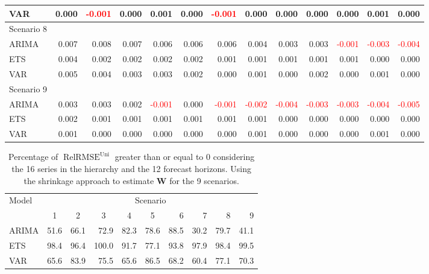 \documentclass[a4paper,preprint,11pt,authoryear]{elsarticle}
\DeclareMathOperator{\RelRMSE}{RelRMSE}
\DeclareMathOperator{\Uni}{Uni}
\begin{document}
\begin{table}
{\begin{tabular}{lrrrrrrrrrrrr}
      VAR & 0.000 & \textcolor{red}{-0.001} & 0.000 & 0.001 & 0.000 & \textcolor{red}{-0.001} & 0.000 & 0.000 & 0.000 & 0.000 & 0.001 & 0.000 \\
      \hline
      Scenario 8 & & & & & & & & & & & & \\
      \hline
      ARIMA & 0.007 & 0.008 & 0.007 & 0.006 & 0.006 & 0.006 & 0.004 & 0.003 & 0.003 & \textcolor{red}{-0.001} & \textcolor{red}{-0.003} & \textcolor{red}{-0.004} \\
      ETS & 0.004 & 0.002 & 0.002 & 0.002 & 0.002 & 0.001 & 0.001 & 0.001 & 0.001 & 0.001 & 0.000 & 0.000 \\
      VAR & 0.005 & 0.004 & 0.003 & 0.003 & 0.002 & 0.000 & 0.001 & 0.000 & 0.002 & 0.000 & 0.001 & 0.000 \\
      \hline
      Scenario 9 & & & & & & & & & & & & \\
      \hline
      ARIMA & 0.003 & 0.003 & 0.002 & \textcolor{red}{-0.001} & 0.000 & \textcolor{red}{-0.001} & \textcolor{red}{-0.002} & \textcolor{red}{-0.004} & \textcolor{red}{-0.003} & \textcolor{red}{-0.003} & \textcolor{red}{-0.004} & \textcolor{red}{-0.005} \\
      ETS & 0.002 & 0.001 & 0.001 & 0.001 & 0.001 & 0.001 & 0.001 & 0.000 & 0.000 & 0.000 & 0.000 & 0.000 \\
      VAR & 0.001 & 0.000 & 0.000 & 0.000 & 0.000 & 0.000 & 0.001 & 0.000 & 0.000 & 0.000 & 0.001 & 0.000 \\
      \hline
    \end{tabular}%
  }
  \label{tab:sh_uni_mean}
\end{table}

\begin{table}
  \caption{Percentage of $\RelRMSE^{\Uni}$ greater than or equal to 0 considering the 16 series in the hierarchy and the 12 forecast horizons. Using the shrinkage approach to estimate $\bm{W}$ for the 9 scenarios.}
  \centering
  \begin{tabular}{lrrrrrrrrr}
    \hline
    \multirow{2}{*}{Model} & \multicolumn{9}{c}{Scenario} \\ \cline{2-10}
    & \multicolumn{1}{c}{1} & \multicolumn{1}{c}{2} & \multicolumn{1}{c}{3} & \multicolumn{1}{c}{4} & \multicolumn{1}{c}{5} & 6 & 7 & 8 & 9 \\ \hline
    ARIMA & 51.6 & 66.1 & 72.9 & 82.3 & 78.6 & 88.5 & 30.2 & 79.7 & 41.1 \\
    ETS & 98.4 & 96.4 & 100.0 & 91.7 & 77.1 & 93.8 & 97.9 & 98.4 & 99.5 \\
    VAR & 65.6 & 83.9 & 75.5 & 65.6 & 86.5 & 68.2 & 60.4 & 77.1 & 70.3 \\
    \hline
  \end{tabular}%
  \label{tab:porc_sh_uni}
\end{table}
\end{document}
